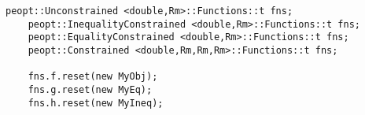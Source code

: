 \begin{lstlisting}[style=C++]
    peopt::Unconstrained <double,Rm>::Functions::t fns;
    peopt::InequalityConstrained <double,Rm>::Functions::t fns;
    peopt::EqualityConstrained <double,Rm>::Functions::t fns;
    peopt::Constrained <double,Rm,Rm,Rm>::Functions::t fns;

    fns.f.reset(new MyObj);
    fns.g.reset(new MyEq);
    fns.h.reset(new MyIneq);
\end{lstlisting}
